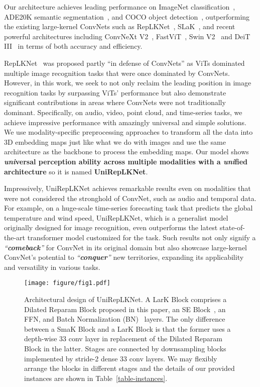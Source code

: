 \documentclass[10pt,twocolumn,letterpaper]{article}
\begin{document}
Our architecture achieves leading performance on ImageNet classification~\cite{deng2009imagenet}, ADE20K semantic segmentation~\cite{zhou2019semantic}, and COCO object detection~\cite{lin2014microsoft}, outperforming the existing large-kernel ConvNets such as RepLKNet~\cite{ding2022scaling}, SLaK~\cite{liu2022more}, and recent powerful architectures including ConvNeXt V2~\cite{woo2023convnext}, FastViT~\cite{vasu2023fastvit}, Swin V2~\cite{liu2022swin} and DeiT III~\cite{touvron2022deit} in terms of both accuracy and efficiency. 

RepLKNet~\cite{ding2022scaling} was proposed partly ``in defense of ConvNets'' as ViTs dominated multiple image recognition tasks that were once dominated by ConvNets. However, in this work, we seek to not only reclaim the leading position in image recognition tasks by surpassing ViTs' performance but also demonstrate significant contributions in areas where ConvNets were not traditionally dominant. Specifically, on audio, video, point cloud, and time-series tasks, we achieve impressive performance with amazingly universal and simple solutions. We use modality-specific preprocessing approaches to transform all the data into 3D embedding maps just like what we do with images and use the same architecture as the backbone to process the embedding maps. Our model shows \textbf{\emph{uni}versal perception ability across multiple modalities with a \emph{uni}fied architecture} so it is named \textbf{UniRepLKNet}. 

Impressively, UniRepLKNet achieves remarkable results even on modalities that were not considered the stronghold of ConvNet, such as audio and temporal data. For example, on a huge-scale time-series forecasting task that predicts the global temperature and wind speed, UniRepLKNet, which is a generalist model originally designed for image recognition, even outperforms the latest state-of-the-art transformer model customized for the task. Such results not only signify a \emph{``\textbf{comeback}''} for ConvNet in its original domain but also showcase large-kernel ConvNet's potential to \emph{``\textbf{conquer}''} new territories, expanding its applicability and versatility in various tasks.

\begin{figure}
    \begin{center}
            \texttt{[image: figure/fig1.pdf]}
        \vspace{-2mm}
        \caption{Architectural design of UniRepLKNet. A LarK Block comprises a Dilated Reparam Block proposed in this paper, an SE Block~\cite{hu2018squeeze}, an FFN, and Batch Normalization (BN)~\cite{ioffe2015batch} layers. The only difference between a SmaK Block and a LarK Block is that the former uses a depth-wise 33 conv layer in replacement of the Dilated Reparam Block in the latter. Stages are connected by downsampling blocks implemented by stride-2 dense 33 conv layers. We may flexibly arrange the blocks in different stages and the details of our provided instances are shown in Table~\ref{table-instances}.}
        \label{fig-arch}
        \vspace{-0.3in}
    \end{center}
\end{figure}
\end{document}
